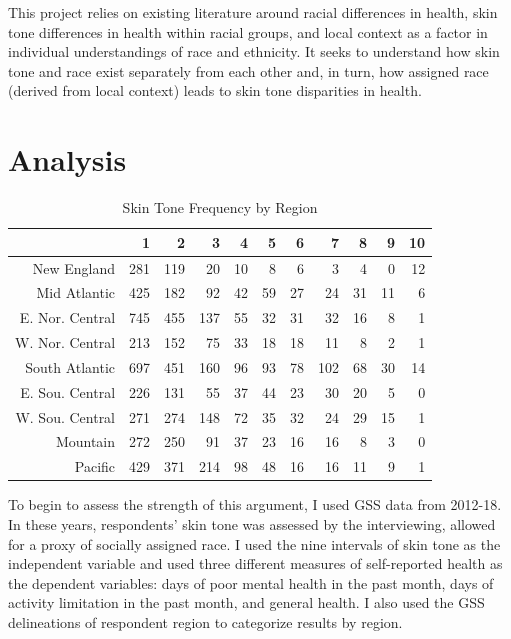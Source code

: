 \documentclass{article}
\begin{document}
This project relies on existing literature around racial differences in health, skin tone differences in health within racial groups, and local context as a factor in individual understandings of race and ethnicity. It seeks to understand how skin tone and race exist separately from each other and, in turn, how assigned race (derived from local context) leads to skin tone disparities in health. 
\section{Analysis}

\begin{table}[ht]
\centering
\begin{tabular}{rrrrrrrrrrr}
  \hline
 & 1 & 2 & 3 & 4 & 5 & 6 & 7 & 8 & 9 & 10 \\ 
  \hline
New England & 281 & 119 & 20 & 10 &  8 &  6 &  3 &  4 &  0 & 12 \\ 
  Mid Atlantic & 425 & 182 & 92 & 42 & 59 & 27 & 24 & 31 & 11 &  6 \\ 
  E. Nor. Central & 745 & 455 & 137 & 55 & 32 & 31 & 32 & 16 &  8 &  1 \\ 
  W. Nor. Central & 213 & 152 & 75 & 33 & 18 & 18 & 11 &  8 &  2 &  1 \\ 
  South Atlantic & 697 & 451 & 160 & 96 & 93 & 78 & 102 & 68 & 30 & 14 \\ 
  E. Sou. Central & 226 & 131 & 55 & 37 & 44 & 23 & 30 & 20 &  5 &  0 \\ 
  W. Sou. Central & 271 & 274 & 148 & 72 & 35 & 32 & 24 & 29 & 15 &  1 \\ 
  Mountain & 272 & 250 & 91 & 37 & 23 & 16 & 16 &  8 &  3 &  0 \\ 
  Pacific & 429 & 371 & 214 & 98 & 48 & 16 & 16 & 11 &  9 &  1 \\ 
   \hline
\end{tabular}
\caption{Skin Tone Frequency by Region} 
\label{tab:table1}
\end{table}
To begin to assess the strength of this argument, I used GSS data from 2012-18. In these years, respondents’ skin tone was assessed by the interviewing, allowed for a proxy of socially assigned race. I used the nine intervals of skin tone as the independent variable and used three different measures of self-reported health as the dependent variables: days of poor mental health in the past month, days of activity limitation in the past month, and general health. I also used the GSS delineations of respondent region to categorize results by region. 
\end{document}

